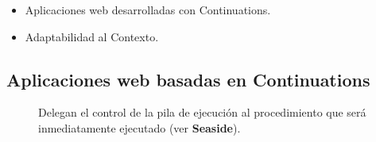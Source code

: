 \documentclass[
paper=128mm:96mm, %
fontsize=11pt, %
pagesize, %
parskip=half-, %
]{scrartcl} %
\theoremstyle{mythmstyle} %
\begin{document}
\begin{itemize}
	\item Aplicaciones web desarrolladas con Continuations.
	\item Adaptabilidad al Contexto.
\end{itemize}

\clearpage








\subsection{Aplicaciones web basadas en Continuations}

\begin{figure}[ht!]
\centering
Delegan el control de la pila de ejecución al procedimiento que será inmediatamente ejecutado (ver \textbf{Seaside}).
\end{figure}
\end{document}
